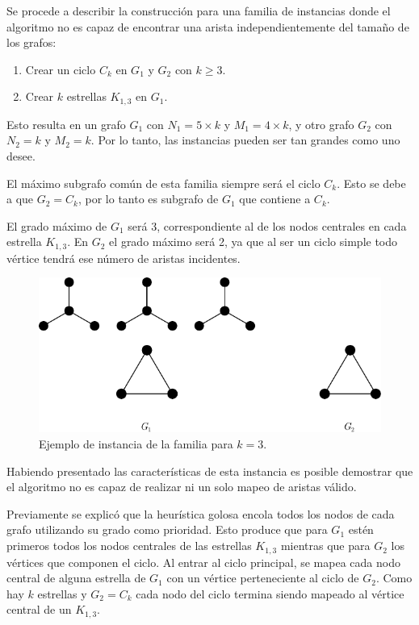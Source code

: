 Se procede a describir la construcción para una familia de instancias donde el
algoritmo no es capaz de encontrar una arista independientemente del tamaño
de los grafos:

\begin{enumerate}
	\item Crear un ciclo $C_k$ en $G_1$ y $G_2$ con $k \geq 3$.
	\item Crear $k$ estrellas $K_{1,3}$ en $G_1$.
\end{enumerate}

Esto resulta en un grafo $G_1$ con $N_1 = 5 \times k$ y $M_1 = 4 \times k$,
y otro grafo $G_2$ con $N_2 = k$ y $M_2 = k$. Por lo tanto, las instancias
pueden ser tan grandes como uno desee.

El máximo subgrafo común de esta familia siempre será el ciclo $C_k$. Esto se
debe a que $G_2 = C_k$, por lo tanto es subgrafo de $G_1$ que contiene a $C_k$.

El grado máximo de $G_1$ será 3, correspondiente al de los nodos
centrales en cada estrella $K_{1,3}$. En $G_2$ el grado máximo será 2, ya que al
ser un ciclo simple todo vértice tendrá ese número de aristas incidentes.

\begin{figure}[H]
	\centering
	\includegraphics{imagenes/ex4.pdf}
	\caption{Ejemplo de instancia de la familia para $k = 3$.}
	\label{fig:heuristica-golosa:ejemplo-g1-suboptimo}
\end{figure}

Habiendo presentado las características de esta instancia es posible demostrar
que el algoritmo no es capaz de realizar ni un solo mapeo de aristas válido.

Previamente se explicó que la heurística golosa encola todos los nodos de cada
grafo utilizando su grado como prioridad. Esto produce que para $G_1$ estén
primeros todos los nodos centrales de las estrellas $K_{1,3}$ mientras que para
$G_2$ los vértices que componen el ciclo. Al entrar al ciclo principal, se mapea
cada nodo central de alguna estrella de $G_1$ con un vértice perteneciente al
ciclo de $G_2$. Como hay $k$ estrellas y $G_2 = C_k$ cada nodo del ciclo
termina siendo mapeado al vértice central de un $K_{1,3}$.

